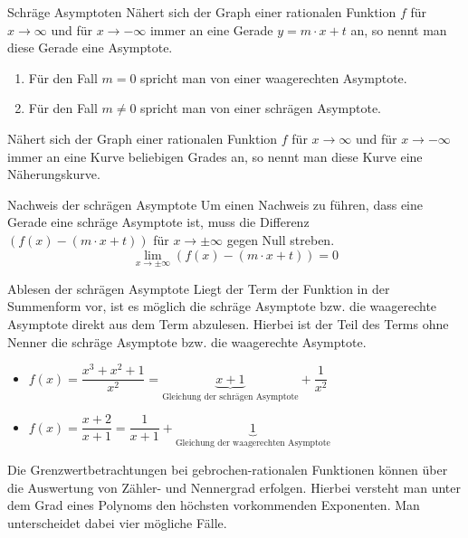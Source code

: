  \begin{merke}{Schräge Asymptoten}{}
    Nähert sich der Graph einer rationalen Funktion $f$ für $x\longrightarrow \infty$ und für  $x\longrightarrow -\infty$ immer an eine Gerade $y=m\cdot x +t$ an, so nennt man diese Gerade eine Asymptote.
    \begin{enumerate}
        \item Für den Fall $m=0$ spricht man von einer waagerechten Asymptote.
        \item Für den Fall $m\neq 0$ spricht man von einer schrägen Asymptote.
    \end{enumerate} 
    Nähert sich der Graph einer rationalen Funktion $f$ für $x\longrightarrow \infty$ und für  $x\longrightarrow -\infty$ immer an eine Kurve beliebigen Grades an, so nennt man diese Kurve eine Näherungskurve.\\ 
\end{merke}
\begin{b8d}{Nachweis der schrägen Asymptote}{}
Um einen Nachweis zu führen, dass eine Gerade eine schräge Asymptote ist, muss die  Differenz \\ $(f(x) - (m\cdot x +t))$ für $x\longrightarrow \pm \infty$ gegen Null streben. $$\lim_{x\longrightarrow \pm \infty} (f(x) - (m\cdot x +t)) = 0$$
\end{b8d}
\begin{b8d}{Ablesen der schrägen Asymptote}{}
Liegt der Term der Funktion in der Summenform vor, ist es möglich die schräge Asymptote bzw. die waagerechte Asymptote direkt aus dem Term abzulesen. Hierbei ist der Teil des Terms ohne Nenner die schräge Asymptote bzw. die waagerechte Asymptote.
\end{b8d}
\begin{bsp}{}{}
\begin{itemize}
    \item $f(x) = \dfrac{x^3+x^2+1}{x^2} = \underbrace{x+1}_{\text{Gleichung der schrägen Asymptote}} +\dfrac{1}{x^2}$
    \item $f(x) = \dfrac{x+2}{x+1}= \dfrac{1}{x+1} + \underbrace{1}_{\text{Gleichung der waagerechten Asymptote}}$
\end{itemize}
\end{bsp}
Die Grenzwertbetrachtungen bei gebrochen-rationalen Funktionen können über die Auswertung von Zähler- und Nennergrad erfolgen. Hierbei versteht man unter dem Grad eines Polynoms den höchsten vorkommenden Exponenten. Man unterscheidet dabei vier mögliche Fälle.

